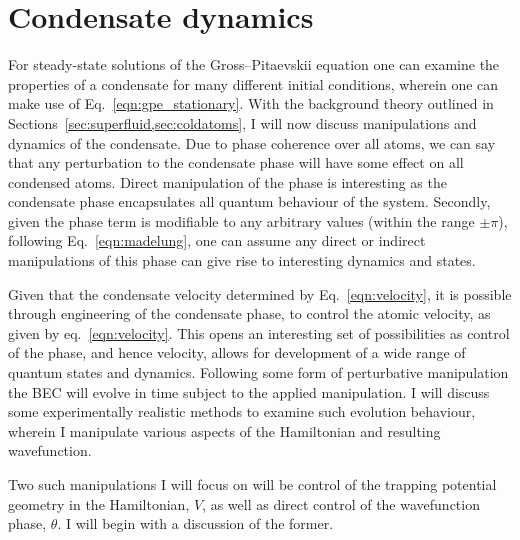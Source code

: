 \section{Condensate dynamics}
For steady-state solutions of the Gross--Pitaevskii equation one can examine the properties of a condensate for many different initial conditions, wherein one can make use of Eq.~\ref{eqn:gpe_stationary}. With the background theory outlined in Sections~\ref{sec:superfluid,sec:coldatoms}, I will now discuss manipulations and dynamics of the condensate. Due to phase coherence over all atoms, we can say that any perturbation to the condensate phase will have some effect on all condensed atoms. Direct manipulation of the phase is interesting as the condensate phase encapsulates all quantum behaviour of the system. Secondly, given the phase term is modifiable to any arbitrary values (within the range $\pm \pi$), following Eq.~\ref{eqn:madelung}, one can assume any direct or indirect manipulations of this phase can give rise to interesting dynamics and states.

Given that the condensate velocity determined by Eq.~\ref{eqn:velocity}, it is possible through engineering of the condensate phase, to control the atomic velocity, as given by eq.~\ref{eqn:velocity}. This opens an interesting set of possibilities as control of the phase, and hence velocity, allows for development of a wide range of quantum states and dynamics. Following some form of perturbative manipulation the BEC will evolve in time subject to the applied manipulation. I will discuss some experimentally realistic methods to examine such evolution behaviour, wherein I manipulate various aspects of the Hamiltonian and resulting wavefunction.

Two such manipulations I will focus on will be control of the trapping potential geometry in the Hamiltonian, $V$, as well as direct control of the wavefunction phase, $\theta$. I will begin with a discussion of the former.




